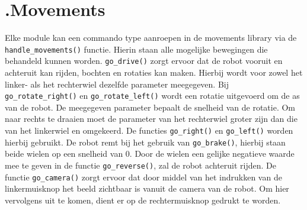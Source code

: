 \documentclass[a4paper,10pt]{article}
\begin{document}
\section*{\label{movements}\thesection.\quad Movements}
Elke module kan een commando type aanroepen in de movements library via de \verb!handle_movements()! functie. Hierin staan alle mogelijke bewegingen die behandeld kunnen worden.  
\verb!go_drive()! zorgt ervoor dat de robot vooruit en achteruit kan rijden, bochten en rotaties kan maken. Hierbij wordt voor zowel het linker- als het rechterwiel dezelfde parameter meegegeven. 
Bij \verb!go_rotate_right()! en \verb!go_rotate_left()! wordt een rotatie uitgevoerd om de as van de robot. De meegegeven parameter bepaalt de snelheid van de rotatie. 
Om naar rechts te draaien moet de parameter van het rechterwiel groter zijn dan die van het linkerwiel en omgekeerd. De functies \verb!go_right()! en \verb!go_left()! worden hierbij gebruikt.
De robot remt bij het gebruik van \verb!go_brake()!, hierbij staan beide wielen op een snelheid van 0.
Door de wielen een gelijke negatieve waarde mee te geven in de functie \verb!go_reverse()!, zal de robot achteruit rijden.
De functie \verb!go_camera()! zorgt ervoor dat door middel van het indrukken van de linkermuisknop het beeld zichtbaar is vanuit de camera van de robot. Om hier vervolgens uit te komen, dient er op de rechtermuisknop gedrukt te worden.


\end{document}
